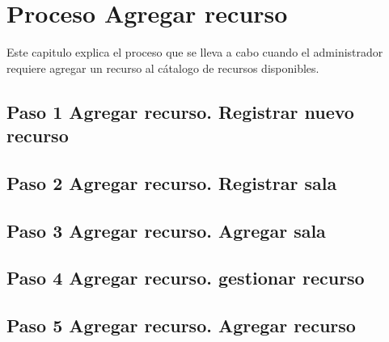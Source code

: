 \chapter{Proceso Agregar recurso}
	Este capitulo explica el proceso que se lleva a cabo cuando el 
	administrador requiere agregar un recurso al cátalogo de recursos
	disponibles.
	
\section{Paso 1  Agregar recurso. Registrar nuevo recurso}
	

\section{Paso 2  Agregar recurso. Registrar sala}
	

\section{Paso 3  Agregar recurso. Agregar sala}
	
	
\section{Paso 4   Agregar recurso. gestionar recurso}
	

\section{Paso 5   Agregar recurso. Agregar recurso}
	